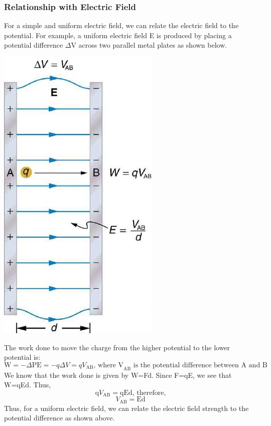\documentclass[9pt]{exam}
\begin{document}
	\subsubsection*{Relationship with Electric Field}
	For a simple and uniform electric field, we can relate the electric field to the potential. For example, a uniform electric field E is produced by placing a potential difference $\Delta$V across two parallel metal plates as shown below.
	\begin{center}
		\includegraphics[scale=0.3]{metal_plates_v}
	\end{center}
	The work done to move the charge from the higher potential to the lower potential is:
	$$\text{W}=-\Delta \text{PE}=-q\Delta V=qV_{\text{AB}}\text{, where V}_{\text{AB}}\text{ is the potential difference between A and B}$$
	We know that the work done is given by W=Fd. Since F=qE, we see that W=qEd. Thus,
	$$\text{q}V_{\text{AB}}=\text{qEd}\text{, therefore,}$$
	$$V_{\text{AB}}=\text{Ed}$$
	Thus, for a uniform electric field, we can relate the electric field strength to the potential difference as shown above.
\end{document}
